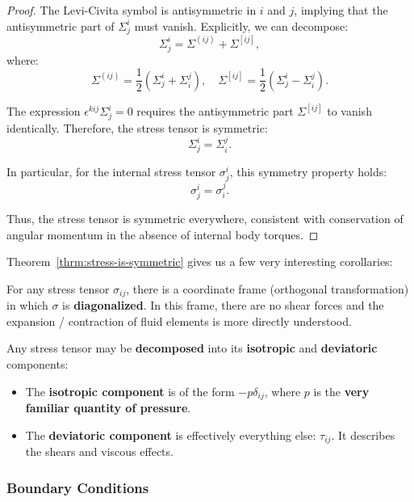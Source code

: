 \begin{proof}
The Levi-Civita symbol is antisymmetric in $i$ and $j$, implying that the antisymmetric part of $\Sigma^i_j$ must vanish. Explicitly, we can decompose:
\[
\Sigma^i_j = \Sigma^{(ij)} + \Sigma^{[ij]},
\]
where:
\[
\Sigma^{(ij)} = \frac{1}{2} \left( \Sigma^i_j + \Sigma^j_i \right), \quad \Sigma^{[ij]} = \frac{1}{2} \left( \Sigma^i_j - \Sigma^j_i \right).
\]

The expression $\epsilon^{kij} \Sigma^i_j = 0$ requires the antisymmetric part $\Sigma^{[ij]}$ to vanish identically. Therefore, the stress tensor is symmetric:
\[
\boxed{ \Sigma^i_j = \Sigma^j_i }.
\]

In particular, for the internal stress tensor $\sigma^i_j$, this symmetry property holds:
\[
\sigma^i_j = \sigma^j_i.
\]

Thus, the stress tensor is symmetric everywhere, consistent with conservation of angular momentum in the absence of internal body torques.

\end{proof}
\vspace{0.5cm}
Theorem~\ref{thrm:stress-is-symmetric} gives us a few very interesting corollaries:

\begin{corollary}
    For any stress tensor $\sigma_{ij}$, there is a coordinate frame (orthogonal transformation) in which $\sigma$ is \textbf{diagonalized}. In this frame, there are no shear forces and the expansion / contraction of fluid elements is more directly understood.
\end{corollary}

\begin{corollary}
    Any stress tensor may be \textbf{decomposed} into its \textbf{isotropic} and \textbf{deviatoric} components:
    
    \begin{itemize}
        \item The \textbf{isotropic component} is of the form $-p \delta_{ij}$, where $p$ is the \textbf{very familiar quantity of pressure}.
        \item The \textbf{deviatoric component} is effectively everything else: $\tau_{ij}$. It describes the shears and viscous effects.
    \end{itemize}
\end{corollary}

\subsubsection{Boundary Conditions}

